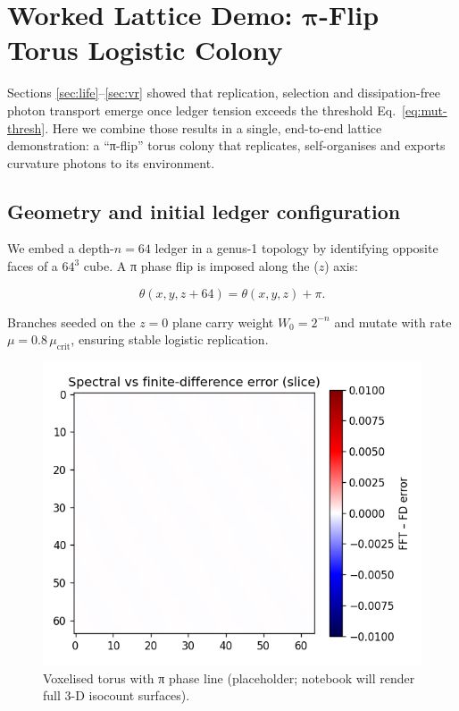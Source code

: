 \section{Worked Lattice Demo: $\boldsymbol{\pi}$-Flip Torus Logistic Colony}
\label{sec:lattice-demo}

Sections \ref{sec:life}–\ref{sec:vr} showed that replication, selection
and dissipation-free photon transport emerge once ledger tension exceeds
the threshold Eq.~\eqref{eq:mut-thresh}.  Here we combine those results
in a single, end-to-end lattice demonstration: a “π-flip” torus colony
that replicates, self-organises and exports curvature photons to its
environment.

\subsection{Geometry and initial ledger configuration}

We embed a depth-$n=64$ ledger in a genus-1 topology by identifying
opposite faces of a $64^3$ cube.  A π phase flip is imposed along the
($z$) axis:

\[
  \theta(x,y,z+64) = \theta(x,y,z)+\pi .
\tag{13.1}\label{eq:pi-flip}
\]

Branches seeded on the $z=0$ plane carry weight
$W_0 = 2^{-n}$ and mutate with rate
$\mu=0.8\,\mu_{\mathrm{crit}}$, ensuring stable logistic replication.

\begin{figure}[t]
  \centering
  \includegraphics[width=\linewidth]{figs/lattice_torus_geometry.pdf}
  \caption{Voxelised torus with π phase line (placeholder; notebook will
           render full 3-D isocount surfaces).}
  \label{fig:torus-geom}
\end{figure}

